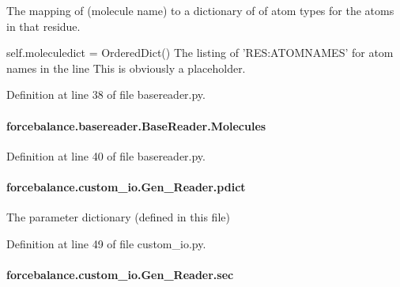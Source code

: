 The mapping of (molecule name) to a dictionary of of atom types for the atoms in that residue. 

self.\-moleculedict = Ordered\-Dict() The listing of 'R\-E\-S\-:A\-T\-O\-M\-N\-A\-M\-E\-S' for atom names in the line This is obviously a placeholder. 

Definition at line 38 of file basereader.\-py.

\hypertarget{classforcebalance_1_1basereader_1_1BaseReader_ad2842550aa690f1cd82e41ec8d6fe541}{
\paragraph[{Molecules}]{\setlength{\rightskip}{0pt plus 5cm}forcebalance.\-basereader.\-Base\-Reader.\-Molecules\hspace{0.3cm}{\ttfamily [inherited]}}}\label{classforcebalance_1_1basereader_1_1BaseReader_ad2842550aa690f1cd82e41ec8d6fe541}


Definition at line 40 of file basereader.\-py.

\hypertarget{classforcebalance_1_1custom__io_1_1Gen__Reader_a9beae2927c39b25cd569c4d2a3902c7d}{
\paragraph[{pdict}]{\setlength{\rightskip}{0pt plus 5cm}forcebalance.\-custom\-\_\-io.\-Gen\-\_\-\-Reader.\-pdict}}\label{classforcebalance_1_1custom__io_1_1Gen__Reader_a9beae2927c39b25cd569c4d2a3902c7d}


The parameter dictionary (defined in this file) 



Definition at line 49 of file custom\-\_\-io.\-py.

\hypertarget{classforcebalance_1_1custom__io_1_1Gen__Reader_ab6d68d48b38f27548edb3a4c3061f490}{
\paragraph[{sec}]{\setlength{\rightskip}{0pt plus 5cm}forcebalance.\-custom\-\_\-io.\-Gen\-\_\-\-Reader.\-sec}}\label{classforcebalance_1_1custom__io_1_1Gen__Reader_ab6d68d48b38f27548edb3a4c3061f490}


